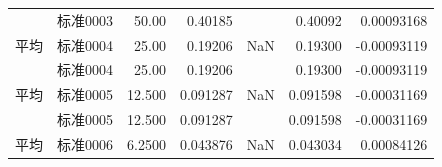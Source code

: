 \documentclass[UTF8,10pt,a4paper,fontset=fandol]{ctexart}
\newcommand{\fieldvalue}[1]{#1}
\begin{document}
\begin{tabularx}{\textwidth}{l l r r r r r}
&
\fieldvalue{标准0003} &
\fieldvalue{50.00} &
\fieldvalue{0.40185} & &
\fieldvalue{0.40092} &
\fieldvalue{0.00093168} \\

平均 &
\fieldvalue{标准0004} &
\fieldvalue{25.00} &
\fieldvalue{0.19206} &
\fieldvalue{NaN} &
\fieldvalue{0.19300} &
\fieldvalue{-0.00093119} \\

&
\fieldvalue{标准0004} &
\fieldvalue{25.00} &
\fieldvalue{0.19206} & &
\fieldvalue{0.19300} &
\fieldvalue{-0.00093119} \\

平均 &
\fieldvalue{标准0005} &
\fieldvalue{12.500} &
\fieldvalue{0.091287} &
\fieldvalue{NaN} &
\fieldvalue{0.091598} &
\fieldvalue{-0.00031169} \\

&
\fieldvalue{标准0005} &
\fieldvalue{12.500} &
\fieldvalue{0.091287} & &
\fieldvalue{0.091598} &
\fieldvalue{-0.00031169} \\

平均 &
\fieldvalue{标准0006} &
\fieldvalue{6.2500} &
\fieldvalue{0.043876} &
\fieldvalue{NaN} &
\fieldvalue{0.043034} &
\fieldvalue{0.00084126} \\


\end{tabularx}
\end{document}
